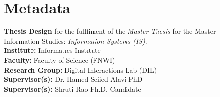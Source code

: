 \section*{Metadata}

\textbf{Thesis Design} for the fullfiment of the \emph{Master Thesis} for the Master Information Studies: \emph{Information Systems (IS)}. \\

{\parindent0pt \textbf{Institute:} Informatics Institute} \\
\textbf{Faculty:} Faculty of Science (FNWI) \\
\textbf{Research Group:} Digital Interactions Lab (DIL) \\
\textbf{Supervisor(s):} Dr. Hamed Seiied Alavi PhD \\
\textbf{Supervisor(s):} Shruti Rao Ph.D. Candidate \\
